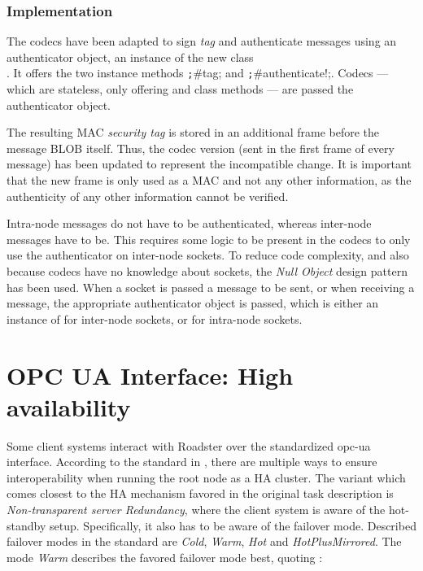 \subsubsection{Implementation}
The codecs have been adapted to sign \emph{tag} and authenticate messages using
an authenticator object, an instance of the
new class\\. It offers the two
instance methods \texttt;#tag; and \texttt;#authenticate!;.
Codecs --- which are stateless, only offering  and 
class methods --- are passed the authenticator object.

The resulting MAC \emph{security tag} is stored in an additional \zmq frame
before the message BLOB itself. Thus, the codec version (sent in the first
frame of every message) has been updated to represent the incompatible change.
It is important that the new frame is only used as a MAC and not any other
information, as the authenticity of any other information cannot be verified.

Intra-node messages do not have to be authenticated, whereas inter-node
messages have to be. This requires some logic to be present in the codecs
to only use the authenticator on inter-node sockets. To reduce
code complexity, and also because codecs have no knowledge about sockets, the
\emph{Null Object} design pattern has been used. When a socket is passed a
message to be sent, or when receiving a message, the appropriate authenticator
object is passed, which is either an instance of
 for inter-node sockets, or
 for intra-node sockets.


\section{OPC UA Interface: High availability}\label{sec:approach:opc-ua}
Some client systems interact with Roadster over the standardized \gls{opc-ua}
interface. According to the standard in \cite[6.4.2 Server Redundancy,
p.~94]{opc-ua:behavior:server-redundancy}, there are multiple ways to ensure
interoperability when running the root node as a \gls{HA} cluster. The variant
which comes closest to the \gls{HA} mechanism favored in the original task description is
\emph{Non-transparent server Redundancy}, where the client system is aware of
the hot-standby setup. Specifically, it also has to be aware of the failover
mode. Described failover modes in the standard are \emph{Cold}, \emph{Warm},
\emph{Hot} and \emph{HotPlusMirrored}. The mode \emph{Warm} describes the
favored failover mode best, quoting \cite[6.4.2.4.4 Server Failover Modes,
p.~98]{opc-ua:behavior:server-redundancy}:


